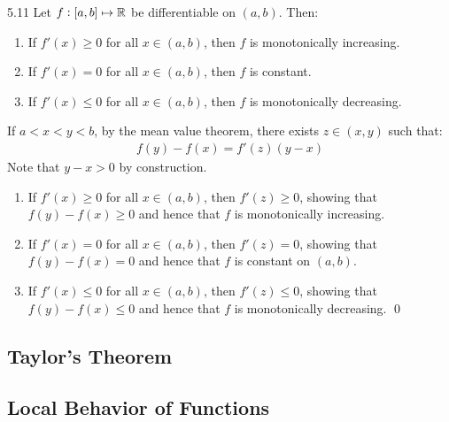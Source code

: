 \begin{theorem}{}{5.11}
    Let $f: [a, b] \mapsto \mathbb{R}$ be differentiable on $(a, b)$. Then:
    \begin{enumerate}
        \item If $f'(x) \geq 0$ for all $x \in (a, b)$, then $f$ is monotonically increasing.
        \item If $f'(x) = 0$ for all $x \in (a, b)$, then $f$ is constant. 
        \item If $f'(x) \leq 0$ for all $x \in (a, b)$, then $f$ is monotonically decreasing.
    \end{enumerate} 
\end{theorem}
\begin{nproof}
    If $a < x < y < b$, by the mean value theorem, there exists $z \in (x, y)$ such that:
    \begin{align*}
        f(y) - f(x) = f'(z)(y - x)
    \end{align*}
    Note that $y - x > 0$ by construction. 
    \begin{enumerate}
        \item If $f'(x) \geq 0$ for all $x \in (a, b)$, then $f'(z) \geq 0$, showing that $f(y) - f(x) \geq 0$ and hence that $f$ is monotonically increasing. 
        \item If $f'(x) = 0$ for all $x \in (a, b)$, then $f'(z) = 0$, showing that $f(y) - f(x) = 0$ and hence that $f$ is constant on $(a, b)$.
        \item If $f'(x) \leq 0$ for all $x \in (a, b)$, then $f'(z) \leq 0$, showing that $f(y) - f(x) \leq 0$ and hence that $f$ is monotonically decreasing. \qed
    \end{enumerate}
\end{nproof}

\subsection{Taylor's Theorem}

\subsection{Local Behavior of Functions}
